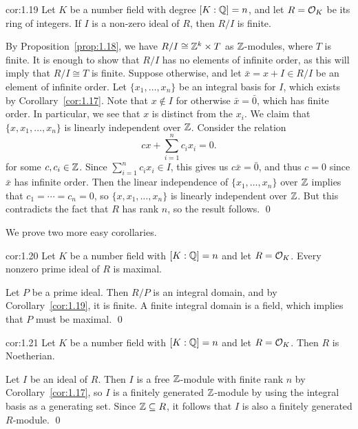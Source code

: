 \begin{cor}{cor:1.19}
    Let $K$ be a number field with degree $[K : \mathbb{Q}] = n$, and let 
    $R = {\cal O}_K$ be its ring of integers. 
    If $I$ is a non-zero ideal of $R$, then $R/I$ is finite. 
\end{cor}\vspace{-0.15cm}
\begin{pf}
    By Proposition~\ref{prop:1.18}, we have $R/I \cong \mathbb{Z}^k \times T$ 
    as $\mathbb{Z}$-modules, where $T$ is finite. It is enough to show that 
    $R/I$ has no elements of infinite order, as this will imply that 
    $R/I \cong T$ is finite. Suppose otherwise, and let $\bar{x} = 
    x + I \in R/I$ be an element of infinite order. Let $\{x_1, \dots, x_n\}$
    be an integral basis for $I$, which exists by Corollary~\ref{cor:1.17}. 
    Note that $x \notin I$ for otherwise $\bar{x} = \bar{0}$, which has 
    finite order. In particular, we see that $x$ is distinct from 
    the $x_i$. We claim that $\{x, x_1, \dots, x_n\}$ is linearly independent 
    over $\mathbb{Z}$. Consider the relation 
    \[ cx + \sum_{i=1}^n c_i x_i = 0. \] 
    for some $c, c_i \in \mathbb{Z}$. Since $\sum_{i=1}^n c_i x_i \in I$, this gives 
    us $c\bar{x} = \bar{0}$, and thus $c = 0$ since $\bar{x}$ has infinite 
    order. Then the linear independence of $\{x_1, \dots, x_n\}$ over $\mathbb{Z}$ 
    implies that $c_1 = \cdots = c_n = 0$, so $\{x, x_1, \dots, x_n\}$ 
    is linearly independent over $\mathbb{Z}$. But this contradicts the fact that $R$ 
    has rank $n$, so the result follows. \qed
\end{pf}\vspace{-0.25cm}

We prove two more easy corollaries. 

\begin{cor}{cor:1.20}
    Let $K$ be a number field with $[K : \mathbb{Q}] = n$ and let $R = {\cal O}_K$. 
    Every nonzero prime ideal of $R$ is maximal.
\end{cor}\vspace{-0.15cm}
\begin{pf}
    Let $P$ be a prime ideal. Then $R/P$ is an integral domain, and by 
    Corollary~\ref{cor:1.19}, it is finite. A finite integral 
    domain is a field, which implies that $P$ must be maximal. \qed
\end{pf}

\begin{cor}{cor:1.21}
    Let $K$ be a number field with $[K : \mathbb{Q}] = n$ and let $R = {\cal O}_K$. 
    Then $R$ is Noetherian. 
\end{cor}\vspace{-0.15cm}
\begin{pf}
    Let $I$ be an ideal of $R$. Then $I$ is a free $\mathbb{Z}$-module with 
    finite rank $n$ by Corollary~\ref{cor:1.17}, so $I$ is a finitely 
    generated $\mathbb{Z}$-module by using the integral basis as a generating set. 
    Since $\mathbb{Z} \subseteq R$, it follows that $I$ is also a finitely 
    generated $R$-module. \qed
\end{pf}